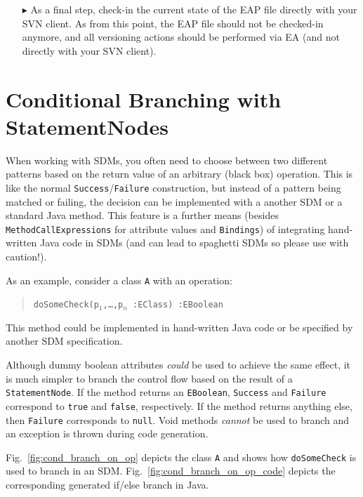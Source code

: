 \begin{enumerate}
\item[$\blacktriangleright$] As a final step, check-in the current state of the EAP file directly with your SVN client. 
As from this point, the EAP file should not be checked-in anymore, and all versioning actions should be performed via EA (and not directly with your SVN client).
\end{enumerate}

\section{Conditional Branching with StatementNodes}

When working with SDMs, you often need to choose between two different patterns based on the return value of an arbitrary (black box) operation.
This is like the normal \texttt{Success}/\texttt{Failure} construction, but instead of a pattern being matched or failing, the decision can be implemented with a another SDM or a standard Java method.
This feature is a further means (besides \texttt{MethodCallExpressions} for attribute values and \texttt{Bindings}) of integrating hand-written Java code in SDMs (and can lead to spaghetti SDMs so please use with caution!). 

As an example, consider a class \texttt{A} with an operation:
\begin{quote}
 \mbox{\texttt{doSomeCheck(p$_1$,\ldots,p$_n$ :EClass) :EBoolean}}
\end{quote}

This method could be implemented in hand-written Java code or be specified by another SDM specification.

Although dummy boolean attributes \emph{could} be used to achieve the same effect, it is much simpler to branch the control flow based on the result of a \texttt{StatementNode}.
If the method returns an \texttt{EBoolean}, \texttt{Success} and \texttt{Failure} correspond to \texttt{true} and \texttt{false}, respectively.
If the method returns anything else, then \texttt{Failure} corresponds to \texttt{null}.
Void methods \emph{cannot} be used to branch and an exception is thrown during code generation.

Fig.~\ref{fig:cond_branch_on_op} depicts the class \texttt{A} and shows how \texttt{doSomeCheck} is used to branch in an SDM.
Fig.~\ref{fig:cond_branch_on_op_code} depicts the corresponding generated if/else branch in Java. 


